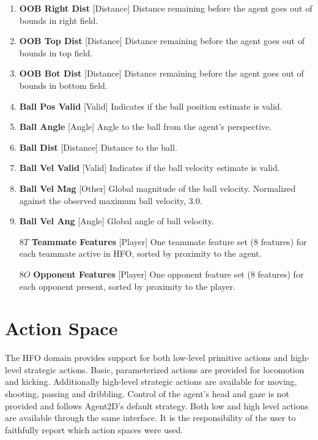 \documentclass[12pt]{article}
\def\itemrange#1{%
\addtocounter{enumi}{1}%
\edef\labelenumi{\theenumi--\noexpand\theenumi}%
\addtocounter{enumi}{-1}%
\addtocounter{enumi}{#1}%
\item
\def\labelenumi{\theenumi}}
\renewcommand*{\labelenumi}{\theenumi}
\begin{document}
\begin{enumerate}
{    point of the left side of the HFO playable area. E.g. distance
    remaining before the agent goes out of bounds in left field.}
  \item{\textbf{OOB Right Dist} [Distance] Distance remaining before
    the agent goes out of bounds in right field.}
  \item{\textbf{OOB Top Dist} [Distance] Distance remaining before
    the agent goes out of bounds in top field.}
  \item{\textbf{OOB Bot Dist} [Distance] Distance remaining before
    the agent goes out of bounds in bottom field.}
  \item{\textbf{Ball Pos Valid} [Valid] Indicates if the ball position estimate is valid.}
  \itemrange{1}{\textbf{Ball Angle} [Angle] Angle to the ball from the agent's perspective.}
  \item{\textbf{Ball Dist} [Distance] Distance to the ball.}
  \item{\textbf{Ball Vel Valid} [Valid] Indicates if the ball velocity estimate is valid.}
  \item{\textbf{Ball Vel Mag} [Other] Global magnitude of the ball velocity. Normalized against the observed maximum ball velocity, 3.0.}
  \itemrange{1}{\textbf{Ball Vel Ang} [Angle] Global angle of ball velocity.}
  \item [$8T$] {\textbf{Teammate Features} [Player] One teammate feature set (8 features) for each teammate active in HFO, sorted by proximity to the agent.}
  \item [$8O$] {\textbf{Opponent Features} [Player] One opponent feature set (8 features) for each opponent present, sorted by proximity to the player.}
\end{enumerate}

\section{Action Space}
The HFO domain provides support for both low-level primitive actions
and high-level strategic actions. Basic, parameterized actions are
provided for locomotion and kicking. Additionally high-level strategic
actions are available for moving, shooting, passing and
dribbling. Control of the agent's head and gaze is not provided and
follows Agent2D's default strategy. Both low and high level actions
are available through the same interface. It is the responsibility of
the user to faithfully report which action spaces were used.
\end{document}
